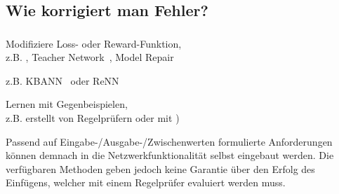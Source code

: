 \subsection{Wie korrigiert man Fehler?}

\begin{frame}\frametitle<presentation>{\insertsubsection}
  \begin{description}
  \item[Anlernen] Modifiziere Loss- oder Reward-Funktion,
    \\<presentation> z.B.
    \cite{roychowdhury_image_2018},
    Teacher Network~\cite{hu_harnessing_2016},
    Model Repair~\cite{ghosh_trusted_2016}
  \item[Anpassen der Topologie] z.B.
    KBANN~\cite{opitz_heuristically_1993} oder ReNN~\cite{wang_renn:_2018}
  \item[Neue Daten] Lernen mit Gegenbeispielen,
    \\<presentation>
    z.B. erstellt von Regelprüfern oder mit
    \cite{%
      dreossi_counterexample-guided_2018,%
      youcheng_concolic_2018,%
      guo_dlfuzz:_2018,%
      he_decision_2018%
      })
  \end{description}
\end{frame}
Passend auf Eingabe-/Ausgabe-/Zwischenwerten formulierte
Anforderungen können demnach in die Netzwerkfunktionalität selbst
eingebaut werden. Die verfügbaren Methoden geben jedoch keine Garantie
über den Erfolg des Einfügens, welcher mit einem Regelprüfer evaluiert
werden muss.



